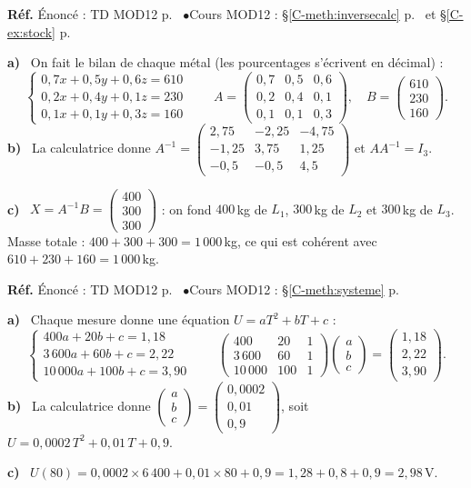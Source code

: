 \documentclass[a4paper,11pt]{article}
\newcommand{\M}[1]{\begin{pmatrix}#1\end{pmatrix}}
\newcommand{\cours}[1]{§\ref{C-#1} p.~\pageref{C-#1}}
\newcommand{\source}[2]{{\footnotesize\color{uimmgray}\textbf{Réf.} \enspace Énoncé : TD MOD12 p.~\pageref{T-#1} \enspace$\bullet$\enspace Cours MOD12 : #2}\par\smallskip}
\newcommand{\q}[1]{\textbf{\color{uimmblue}#1}\ }
\begin{document}
\begin{correction}
\source{exo:14}{\cours{meth:inversecalc} et \cours{ex:stock}}
\q{a)} On fait le bilan de chaque métal (les pourcentages s'écrivent en décimal) :
\[
\left\{\begin{array}{l} 0{,}7x + 0{,}5y + 0{,}6z = 610\\ 0{,}2x + 0{,}4y + 0{,}1z = 230\\ 0{,}1x + 0{,}1y + 0{,}3z = 160\end{array}\right.
\qquad
A = \M{0{,}7 & 0{,}5 & 0{,}6\\ 0{,}2 & 0{,}4 & 0{,}1\\ 0{,}1 & 0{,}1 & 0{,}3},\quad
B = \M{610\\230\\160}.
\]
\q{b)} La calculatrice donne
$A^{-1} = \M{2{,}75 & -2{,}25 & -4{,}75\\ -1{,}25 & 3{,}75 & 1{,}25\\ -0{,}5 & -0{,}5 & 4{,}5}$
et $AA^{-1} = I_3$.

\q{c)} $X = A^{-1}B = \M{400\\300\\300}$ : on fond $400$\,kg de $L_1$, $300$\,kg de $L_2$ et $300$\,kg de $L_3$.\\
Masse totale : $400 + 300 + 300 = 1\,000$\,kg, ce qui est cohérent avec $610 + 230 + 160 = 1\,000$\,kg.
\end{correction}

\begin{correction}
\source{exo:15}{\cours{meth:systeme}}
\q{a)} Chaque mesure donne une équation $U = aT^2 + bT + c$ :
\[
\left\{\begin{array}{l} 400a + 20b + c = 1{,}18\\ 3\,600a + 60b + c = 2{,}22\\ 10\,000a + 100b + c = 3{,}90\end{array}\right.
\qquad
\M{400 & 20 & 1\\ 3\,600 & 60 & 1\\ 10\,000 & 100 & 1}\M{a\\b\\c} = \M{1{,}18\\2{,}22\\3{,}90}.
\]
\q{b)} La calculatrice donne $\M{a\\b\\c} = \M{0{,}0002\\ 0{,}01\\ 0{,}9}$, soit $U = 0{,}0002\,T^2 + 0{,}01\,T + 0{,}9$.

\q{c)} $U(80) = 0{,}0002\times 6\,400 + 0{,}01\times 80 + 0{,}9 = 1{,}28 + 0{,}8 + 0{,}9 = 2{,}98$\,V.
\end{correction}
\end{document}

